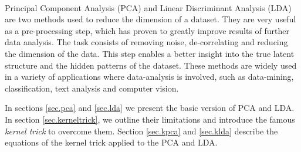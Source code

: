 \paragraph{}
Principal Component Analysis (PCA) and Linear Discriminant Analysis (LDA) are two methods used to
reduce the dimension of a dataset. They are very useful as a pre-processing step, which has proven
to greatly improve results of further data analysis. The task consists of removing noise,
de-correlating and reducing the dimension of the data. This step enables a better insight into
the true latent structure and the hidden patterns of the dataset. These methods are widely used in a
variety of applications where data-analysis is involved, such as data-mining, classification, text
analysis and computer vision.

In sections \ref{sec.pca} and \ref{sec.lda} we present the basic version of PCA and LDA. In section
\ref{sec.kerneltrick}, we outline their limitations and introduce the famous \emph{kernel trick} to
overcome them. Section \ref{sec.kpca} and \ref{sec.klda} describe the equations of the kernel trick
applied to the PCA and LDA.
